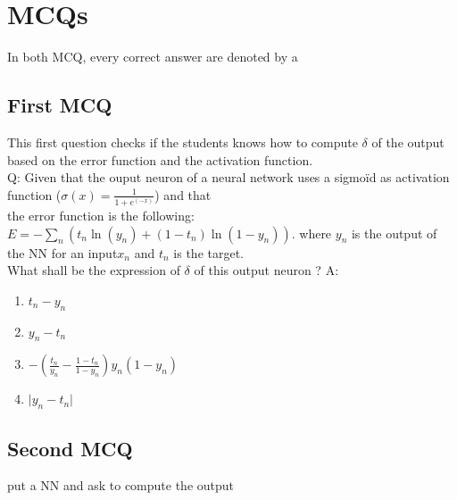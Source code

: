 \documentclass[a4paper, 10pt]{article}
\begin{document}
\section{MCQs}
In both MCQ, every correct answer are denoted by a \textdagger
\subsection{First MCQ}
This first question checks if the students knows how to compute $\delta$ of the output based on the error 
function and the activation function. 
\\
Q: Given that the ouput neuron of a neural network uses a sigmoïd as activation function ($\sigma(x) = \frac{1}{1+e^{(-x)}}$) and that 
\\the error function is the following: $E=- \sum_n(t_n\ln (y_n)  +(1-t_n)\ln (1-y_n))$.
where $y_n$ is the output of the NN for an input$x_n$ and $t_n$ is the target.
\\
What shall be the expression of $\delta$ of this output neuron ?
A:
\begin{enumerate}
   \item $t_n - y_n$
   \item $y_n - t_n$ \textdagger
   \item $-\left(\frac{t_n}{y_n}-\frac{1-t_n}{1-y_n}\right)y_n(1-y_n)$ \textdagger
   \item $\vert y_n-t_n\vert$
\end{enumerate}

\subsection{Second MCQ}
put a NN and ask to compute the output
\end{document}
